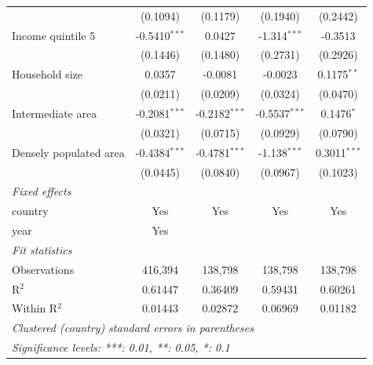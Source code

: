 \begin{tabular}{lcccc}
                              & (0.1094)        & (0.1179)        & (0.1940)        & (0.2442)\\   
   Income quintile 5          & -0.5410$^{***}$ & 0.0427          & -1.314$^{***}$  & -0.3513\\   
                              & (0.1446)        & (0.1480)        & (0.2731)        & (0.2926)\\   
   Household size             & 0.0357          & -0.0081         & -0.0023         & 0.1175$^{**}$\\   
                              & (0.0211)        & (0.0209)        & (0.0324)        & (0.0470)\\   
   Intermediate area          & -0.2081$^{***}$ & -0.2182$^{***}$ & -0.5537$^{***}$ & 0.1476$^{*}$\\   
                              & (0.0321)        & (0.0715)        & (0.0929)        & (0.0790)\\   
   Densely populated area     & -0.4384$^{***}$ & -0.4781$^{***}$ & -1.138$^{***}$  & 0.3011$^{***}$\\   
                              & (0.0445)        & (0.0840)        & (0.0967)        & (0.1023)\\   
   \midrule
   \emph{Fixed effects}\\
   country                    & Yes             & Yes             & Yes             & Yes\\  
   year                       & Yes             &                 &                 & \\  
   \midrule
   \emph{Fit statistics}\\
   Observations               & 416,394         & 138,798         & 138,798         & 138,798\\  
   R$^2$                      & 0.61447         & 0.36409         & 0.59431         & 0.60261\\  
   Within R$^2$               & 0.01443         & 0.02872         & 0.06969         & 0.01182\\  
   \midrule \midrule
   \multicolumn{5}{l}{\emph{Clustered (country) standard errors in parentheses}}\\
   \multicolumn{5}{l}{\emph{Significance levels: ***: 0.01, **: 0.05, *: 0.1}}\\
\end{tabular}
\par\endgroup



